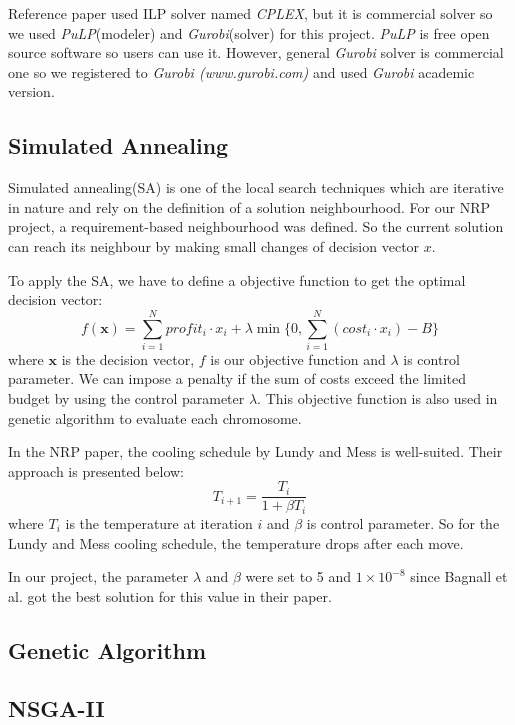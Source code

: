 Reference paper\cite{ILP} used ILP solver named \textit{CPLEX}, but it is commercial solver so we used \textit{PuLP}(modeler) and \textit{Gurobi}(solver) for this project. \textit{PuLP} is free open source software so users can use it. However, general \textit{Gurobi} solver is commercial one so we registered to \textit{Gurobi (www.gurobi.com)} and used \textit{Gurobi} academic version.

\subsection{Simulated Annealing}
Simulated annealing(SA) is one of the local search techniques which are iterative in nature and rely on the definition of a solution neighbourhood. For our NRP project, a requirement-based neighbourhood was defined. So the current solution can reach its neighbour by making small changes of decision vector $x$.

To apply the SA, we have to define a objective function to get the optimal decision vector:
\[
f(\textbf{x}) = \sum_{i = 1}^{N} profit_i \cdot x_i + \lambda \min \Big\{0, \sum_{i = 1}^{N} (cost_i \cdot x_i) - B \Big\}
\]
where $\textbf{x}$ is the decision vector, $f$ is our objective function and $\lambda$ is control parameter. We can impose a penalty if the sum of costs exceed the limited budget by using the control parameter $\lambda$. This objective function is also used in genetic algorithm to evaluate each chromosome.

In the NRP paper\cite{NRP}, the cooling schedule by Lundy and Mess\cite{LundySA} is well-suited. Their approach is presented below:
\[
    T_{i+1} = \frac{T_i}{1 + \beta T_i}
\]
where $T_i$ is the temperature at iteration $i$ and $\beta$ is control parameter. So for the Lundy and Mess cooling schedule, the temperature drops after each move.

In our project, the parameter $\lambda$ and $\beta$ were set to 5 and $1 \times 10^{-8}$ since Bagnall et al. got the best solution for this value in their paper.

\subsection{Genetic Algorithm}

\subsection{NSGA-II}


